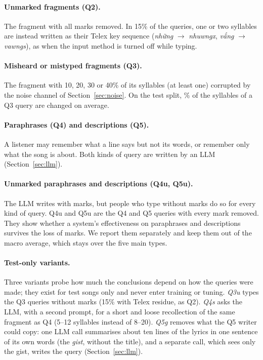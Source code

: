\documentclass[11pt]{article}
\newcommand{\vi}[1]{\textit{#1}}          %
\newcommand{\Qtwo}{Q2\xspace}
\newcommand{\Qthree}{Q3\xspace}
\newcommand{\Qfour}{Q4\xspace}
\newcommand{\Qfive}{Q5\xspace}
\newcommand{\Qfouru}{Q4u\xspace}
\newcommand{\Qfiveu}{Q5u\xspace}
\begin{document}
\paragraph{Unmarked fragments (\Qtwo).} The fragment with all marks removed. In 15\% of the queries, one or
two syllables are instead written as their Telex key sequence (\vi{những} $\rightarrow$ \vi{nhuwngx},
\vi{vắng} $\rightarrow$ \vi{vawngs}), as when the input method is turned off while typing.

\paragraph{Misheard or mistyped fragments (\Qthree).} The fragment with 10, 20, 30 or 40\% of its syllables
(at least one) corrupted by the noise channel of Section~\ref{sec:noise}. On the test split,
\QthreeChanged\% of the syllables of a \Qthree query are changed on average.

\paragraph{Paraphrases (\Qfour) and descriptions (\Qfive).} A listener may remember what a line says but not
its words, or remember only what the song is about. Both kinds of query are written by an LLM
(Section~\ref{sec:llm}).

\paragraph{Unmarked paraphrases and descriptions (\Qfouru, \Qfiveu).} The LLM writes with marks, but people
who type without marks do so for every kind of query. \Qfouru{} and \Qfiveu{} are the \Qfour{} and \Qfive{}
queries with every mark removed. They show whether a system's effectiveness on paraphrases and descriptions
survives the loss of marks. We report them separately and keep them out of the macro average, which stays
over the five main types.

\paragraph{Test-only variants.} Three variants probe how much the conclusions depend on how the queries were
made; they exist for test songs only and never enter training or tuning. \emph{Q3u} types the \Qthree{}
queries without marks (15\% with Telex residue, as \Qtwo). \emph{Q4s} asks the LLM, with a second prompt, for a
short and loose recollection of the same fragment as \Qfour{} (5--12 syllables instead of 8--20).
\emph{Q5g} removes what the \Qfive{} writer could copy: one LLM call summarises about ten lines of the lyrics in
one sentence of its own words (the \emph{gist}, without the title), and a separate call, which sees only the
gist, writes the query (Section~\ref{sec:llm}).
\end{document}
